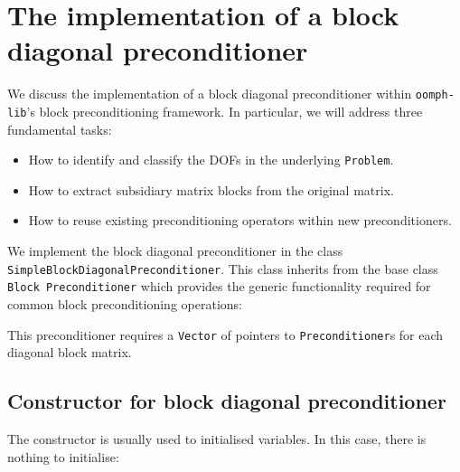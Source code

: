\section{The implementation of a block diagonal preconditioner\label{sec:the_implementation_of_a_block_diagonal_preconditioner}}

We discuss the implementation of a block diagonal preconditioner within
\texttt{oomph-\allowbreak lib}'s block preconditioning framework. In particular, we will
address three fundamental tasks: 
\begin{itemize} 
  \item How to identify and classify the DOFs in the underlying \texttt{Problem}.  
  \item How to extract subsidiary matrix blocks from the original matrix.
  \item How to reuse existing preconditioning operators within new preconditioners.
\end{itemize}

We implement the block diagonal preconditioner in the class
\texttt{Simple\allowbreak Block\allowbreak Diagonal\allowbreak Preconditioner}.
This class inherits from the base class \texttt{Block\allowbreak
  Preconditioner} which provides the generic functionality required for common
block preconditioning operations:
\lstset{numberstyle=\ttfamily\scriptsize,
        breaklines=true, 
        numbers=left, 
        stepnumber=2, 
        frame=single,
        basicstyle=\ttfamily\scriptsize, 
        showstringspaces=false, 
        language=C++}

This preconditioner requires a \texttt{Vector} of pointers to \texttt{Preconditioner}s for each diagonal block matrix.


\subsection{Constructor for block diagonal preconditioner\label{sec:constructor_for_block_diagonal_preconditioner}}
The constructor is usually used to initialised variables. In this case, there is nothing to initialise:


